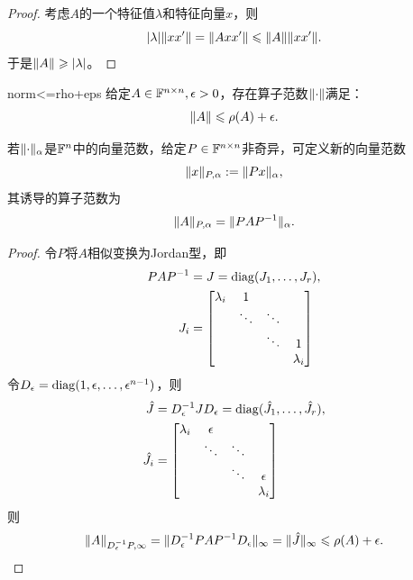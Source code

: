 \begin{proof}
    考虑$A$的一个特征值$\lambda$和特征向量$x$，则 
    \[
        \lvert\lambda\rvert\lVert xx'\rVert = \lVert Axx'\rVert \leqslant \lVert A\rVert\lVert xx'\rVert.
    \]
    于是$\lVert A\rVert \geqslant \lvert\lambda\rvert$。
\end{proof}

\begin{theorem}
    {}{norm<=rho+eps}
    给定$A \in \mathbb{F}^{n\times n},\epsilon > 0$，存在算子范数$\lVert\cdot\rVert$满足：
    \begin{equation}
        \lVert A\rVert \leqslant \rho(A) + \epsilon.
    \end{equation}
\end{theorem}

\begin{lemma}
    若$\lVert\cdot\rVert_\alpha$是$\mathbb{F}^n$中的向量范数，给定$P \in \mathbb{F}^{n\times n}$非奇异，可定义新的向量范数
    \begin{equation}\label{eq:na-transformed-vector-norm}
        \lVert x\rVert_{P,\alpha} := \lVert Px\rVert_\alpha,
    \end{equation}
    其诱导的算子范数为
    \begin{equation}\label{eq:na-transformed-operator-norm}
        \lVert A\rVert_{P,\alpha} = \lVert PAP^{-1}\rVert_\alpha.
    \end{equation}
\end{lemma}

\begin{proof}
    令$P$将$A$相似变换为Jordan型，即
    \begin{align*}
        PAP^{-1} &= J = \operatorname{diag}(J_1,\ldots,J_r),\\
        J_i &= \begin{bmatrix}
            \lambda_i&1\\
            &\ddots&\ddots\\
            &&\ddots&1\\
            &&&\lambda_i
        \end{bmatrix}
    \end{align*}
    令$D_\epsilon = \operatorname{diag}(1,\epsilon,\ldots,\epsilon^{n-1})$，则
    \begin{align*}
        \hat J &= D_\epsilon^{-1} JD_\epsilon = \operatorname{diag}(\hat J_1,\ldots,\hat J_r),\\
        \hat J_i &= \begin{bmatrix}
            \lambda_i&\epsilon\\
            &\ddots&\ddots\\
            &&\ddots&\epsilon\\
            &&&\lambda_i
        \end{bmatrix}
    \end{align*}
    则
    \[
        \lVert A\rVert_{D_\epsilon^{-1} P,\infty} = \lVert D_\epsilon^{-1} PAP^{-1} D_\epsilon\rVert_\infty = \lVert\hat J\rVert_\infty \leqslant \rho(A) + \epsilon.
        \qedhere
    \]
\end{proof}

